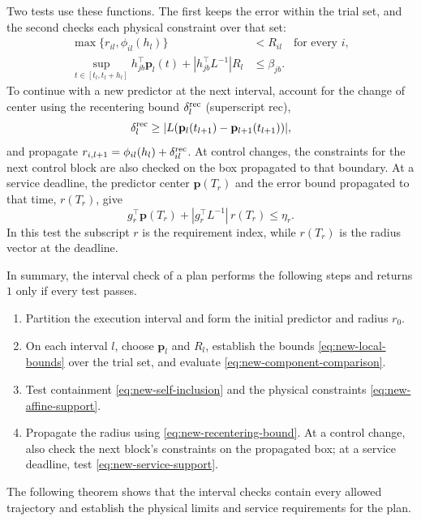 \documentclass[final]{cas-sc}
\theoremstyle{definition}
\theoremstyle{plain}
\theoremstyle{definition}
\theoremstyle{plain}
\begin{document}
Two tests use these functions. The first keeps the error within the
trial set, and the second checks each physical constraint over that
set:
\begin{align}
\max\{r_{il},\phi_{il}(h_l)\}&<R_{il}\quad\text{for every }i,
\label{eq:new-self-inclusion}\\
\sup_{t\in[t_l,t_l+h_l]}h_{jb}^\top\mathbf p_l(t)
+|h_{jb}^\top L^{-1}|R_l&\le\beta_{jb}.
\label{eq:new-affine-support}
\end{align}
To continue with a new predictor at the next interval, account for the
change of center using the recentering bound $\delta_l^{\rm rec}$
(superscript rec),
\begin{equation}
\delta_l^{\rm rec}\ge|L(\mathbf p_l(t_{l+1})-\mathbf p_{l+1}(t_{l+1}))|,
\label{eq:new-recentering-bound}
\end{equation}
and propagate $r_{i,l+1}=\phi_{il}(h_l)+\delta_{il}^{\rm rec}$. At
control changes, the constraints for the next control block are also
checked on the box propagated to that boundary. At a service deadline,
the predictor center $\mathbf p(T_r)$ and the error bound propagated to
that time, $r(T_r)$, give
\begin{equation}
g_r^\top\mathbf p(T_r)+|g_r^\top L^{-1}|\,r(T_r)\le\eta_r .
\label{eq:new-service-support}
\end{equation}
In this test the subscript $r$ is the requirement index, while
$r(T_r)$ is the radius vector at the deadline.

In summary, the interval check of a plan performs the following steps
and returns $1$ only if every test passes.
\begin{enumerate}
\item Partition the execution interval and form the initial predictor
and radius $r_0$.
\item On each interval $l$, choose $\mathbf p_l$ and $R_l$, establish
the bounds \eqref{eq:new-local-bounds} over the trial set, and evaluate
\eqref{eq:new-component-comparison}.
\item Test containment \eqref{eq:new-self-inclusion} and the physical
constraints \eqref{eq:new-affine-support}.
\item Propagate the radius using \eqref{eq:new-recentering-bound}. At a control
change, also check the next block's constraints on the propagated box;
at a service deadline, test \eqref{eq:new-service-support}.
\end{enumerate}
The following theorem shows that the interval checks contain every
allowed trajectory and establish the physical limits and service
requirements for the plan.
\end{document}
